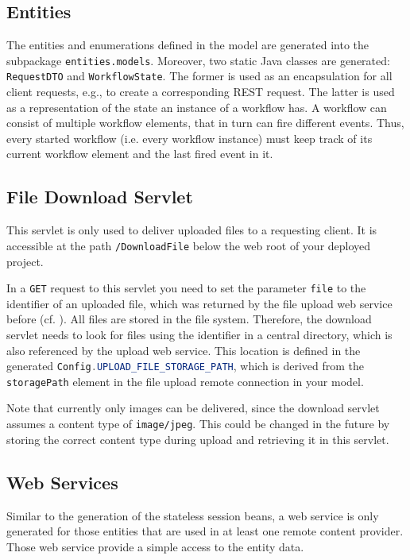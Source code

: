 \subsection{Entities}
The entities and enumerations defined in the \MD model are generated into the subpackage \lstinline|entities.models|. Moreover, two static Java classes are generated:  \lstinline|RequestDTO| and \lstinline|WorkflowState|. The former is used as an encapsulation for all client requests, e.g., to create a corresponding REST request. The latter is used as a representation of the state an instance of a workflow has. A workflow can consist of multiple workflow elements, that in turn can fire different events. Thus, every started workflow (i.e. every workflow instance) must keep track of its current workflow element and the last fired event in it.

\subsection{File Download Servlet}
This servlet is only used to deliver uploaded files to a requesting client. It is accessible at the path \lstinline|/DownloadFile| below the web root of your deployed project. 

In a \lstinline[language=Simple]|GET| request to this servlet you need to set the parameter \lstinline|file| to the identifier of an uploaded file, which was returned by the file upload web service before (cf. ). 
All files are stored in the file system. Therefore, the download servlet needs to look for files using the identifier in a central directory, which is also referenced by the upload web service. This location  is defined in the generated \lstinline[language=Java]|Config.UPLOAD_FILE_STORAGE_PATH|, which is derived from the \lstinline|storagePath| element in the file upload remote connection in your model.

Note that currently only images can be delivered, since the download servlet assumes a content type of \lstinline|image/jpeg|. This could be changed in the future by storing the correct content type during upload and retrieving it in this servlet.

\subsection{Web Services}
Similar to the generation of the stateless session beans, a web service is only generated for those entities that are used in at least one remote content provider. Those web service provide a simple access to the entity data.

